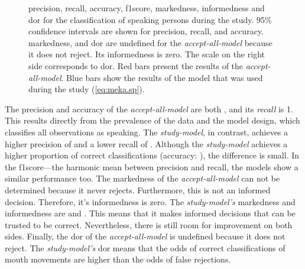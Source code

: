 \begin{figure}[htb]
    \centering
    
    \vspace{-25pt}
    \caption[Speaker classification performance.]{\label{fig:meka-perf-mouth}
    \Gls{precision}, \gls{recall}, \gls{accuracy}, \gls{f1score}, \gls{markedness}, \gls{informedness} and \gls{dor} for the classification of speaking persons during the study.
    95\% confidence intervals are shown for \gls{precision}, \gls{recall}, and \gls{accuracy}.
    \gls{markedness}, and \gls{dor} are undefined for the \emph{accept-all-model} because it does not reject.
    Its \gls{informedness} is zero.
    The scale on the right side corresponds to \gls{dor}.
    Red bars present the results of the \emph{accept-all-model}.
    Blue bars show the results of the model that was used during the study (\cref{eq:meka.sp}).
    }
\end{figure}
The \gls{precision} and \gls{accuracy} of the \emph{accept-all-model} are both , and its \emph{recall} is 1.
This results directly from the \gls{prevalence} of the data and the model design, which classifies all observations as speaking.
The \emph{study-model}, in contrast, achieves a higher \gls{precision} of  and a lower \gls{recall} of .
Although the \emph{study-model} achieves a higher proportion of correct classifications (\gls{accuracy}: ), the difference is small.
In the \gls{f1score}---the harmonic mean between \gls{precision} and \gls{recall}, the models show a similar performance too.
The \gls{markedness} of the \emph{accept-all-model} can not be determined because it never rejects.
Furthermore, this is not an informed decision.
Therefore, it's \gls{informedness} is zero.
The \emph{study-model's} \gls{markedness} and \gls{informedness} are  and .
This means that it makes informed decisions that can be trusted to be correct.
Nevertheless, there is still room for improvement on both sides.
Finally, the \gls{dor} of the \emph{accept-all-model} is undefined because it does not reject.
The \emph{study-model's} \gls{dor} means that the odds of correct classifications of mouth movements are  higher than the odds of false rejections.

